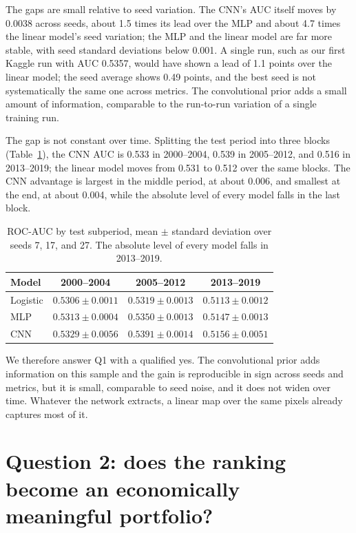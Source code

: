 \documentclass[10pt]{article}
\begin{document}
The gaps are small relative to seed variation. The CNN's AUC itself moves by 0.0038 across seeds, about 1.5 times its lead over the MLP and about 4.7 times the linear model's seed variation; the MLP and the linear model are far more stable, with seed standard deviations below 0.001. A single run, such as our first Kaggle run with AUC 0.5357, would have shown a lead of 1.1 points over the linear model; the seed average shows 0.49 points, and the best seed is not systematically the same one across metrics. The convolutional prior adds a small amount of information, comparable to the run-to-run variation of a single training run.

The gap is not constant over time. Splitting the test period into three blocks (Table~\ref{tab:subperiod-auc}), the CNN AUC is 0.533 in 2000--2004, 0.539 in 2005--2012, and 0.516 in 2013--2019; the linear model moves from 0.531 to 0.512 over the same blocks. The CNN advantage is largest in the middle period, at about 0.006, and smallest at the end, at about 0.004, while the absolute level of every model falls in the last block.

\begin{table}[t]
\centering
\small
\caption{ROC-AUC by test subperiod, mean $\pm$ standard deviation over seeds 7, 17, and 27. The absolute level of every model falls in 2013--2019.}
\label{tab:subperiod-auc}
\begin{tabular}{lccc}
\toprule
Model & 2000--2004 & 2005--2012 & 2013--2019 \\
\midrule
Logistic & $0.5306\pm0.0011$ & $0.5319\pm0.0013$ & $0.5113\pm0.0012$ \\
MLP      & $0.5313\pm0.0004$ & $0.5350\pm0.0013$ & $0.5147\pm0.0013$ \\
CNN      & $0.5329\pm0.0056$ & $0.5391\pm0.0014$ & $0.5156\pm0.0051$ \\
\bottomrule
\end{tabular}
\end{table}

We therefore answer Q1 with a qualified yes. The convolutional prior adds information on this sample and the gain is reproducible in sign across seeds and metrics, but it is small, comparable to seed noise, and it does not widen over time. Whatever the network extracts, a linear map over the same pixels already captures most of it.

\section{Question 2: does the ranking become an economically meaningful portfolio?}
\end{document}
